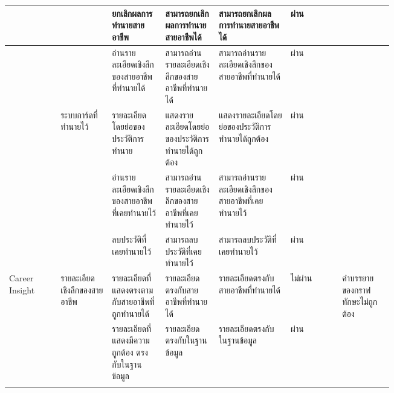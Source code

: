 \begin{longtable}{|>{\centering}p{0.1\linewidth}|p{0.1\linewidth}|p{0.1\linewidth}|p{0.1\linewidth}|p{0.14\linewidth}|>{\centering}p{0.1\linewidth}|p{0.1\linewidth}|}
                       &                                  & ยกเลิกผลการทำนายสายอาชีพ                             & สามารถยกเลิกผลการทำนายสายอาชีพได้                                               & สามารถยกเลิกผลการทำนายสายอาชีพได้                                                      & ผ่าน      &                                                        \\ \cline{3-7}
                       &                                  & อ่านรายละเอียดเชิงลึกของสายอาชีพที่ทำนายได้                & สามารถอ่านรายละเอียดเชิงลึกของสายอาชีพที่ทำนายได้                                    & สามารถอ่านรายละเอียดเชิงลึกของสายอาชีพที่ทำนายได้                                           & ผ่าน      &                                                        \\
    \cline{2-7}
                       & ระบบการ์ดที่ทำนายไว้                  & รายละเอียดโดยย่อของประวัติการทำนาย                     & แสดงรายละเอียดโดยย่อของประวัติการทำนายได้ถูกต้อง                                    & แสดงรายละเอียดโดยย่อของประวัติการทำนายได้ถูกต้อง                                           & ผ่าน      &                                                        \\ \cline{3-7}
                       &                                  & อ่านรายละเอียดเชิงลึกของสายอาชีพที่เคยทำนายไว้             & สามารถอ่านรายละเอียดเชิงลึกของสายอาชีพที่เคยทำนายไว้                                 & สามารถอ่านรายละเอียดเชิงลึกของสายอาชีพที่เคยทำนายไว้                                        & ผ่าน      &                                                        \\ \cline{3-7}
                       &                                  & ลบประวัติที่เคยทำนายไว้                                 & สามารถลบประวัติที่เคยทำนายไว้                                                     & สามารถลบประวัติที่เคยทำนายไว้                                                            & ผ่าน      &                                                        \\ \hline
    Career Insight     & รายละเอียดเชิงลึกของสายอาชีพ         & รายละเอียดที่แสดงตรงตามกับสายอาชีพที่ถูกทำนายได้            & รายละเอียดตรงกับสายอาชีพที่ทำนายได้                                                & รายละเอียดตรงกับสายอาชีพที่ทำนายได้                                                       & ไม่ผ่าน    & คำบรรยายของกราฟทักษะไม่ถูกต้อง                              \\ \cline{3-7}
                       &                                  & รายละเอียดที่แสดงมีความถูกต้อง ตรงกับในฐานข้อมูล           & รายละเอียดตรงกับในฐานข้อมูล                                                     & รายละเอียดตรงกับในฐานข้อมูล                                                            & ผ่าน      &                                                        \\ \cline{3-7}

\end{longtable}
